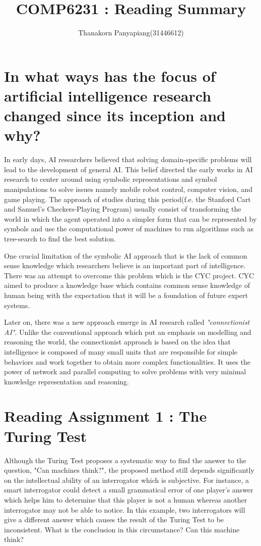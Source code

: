 \documentclass{article}
\title{COMP6231 : Reading Summary}
\author{Thanakorn Panyapiang(31446612)}
\date{}
\begin{document}
\maketitle
\section*{In what ways has the focus of artificial intelligence research changed since its inception and why?}

In early days, AI researchers believed that solving domain-specific problems will lead to the development of general AI. This belief directed the early works in AI research to center around using symbolic representations and symbol manipulations to solve issues namely mobile robot control, computer vision, and game playing. The approach of studies during this period(f.e. the Stanford Cart and Samuel's Checkers-Playing Program) usually consist of transforming the world in which the agent operated into a simpler form that can be represented by symbols and use the computational power of machines to run algorithms such as tree-search to find the best solution.

One crucial limitation of the symbolic AI approach that is the lack of common sense knowledge which researchers believe is an important part of intelligence. There was an attempt to overcome this problem which is the CYC project. CYC aimed to produce a knowledge base which contains common sense knowledge of human being with the expectation that it will be a foundation of future expert systems.

Later on, there was a new approach emerge in AI research called \textit{"connectionist AI"}. Unlike the conventional approach which put an emphasis on modelling and reasoning the world, the connectionist approach is based on the idea that intelligence is composed of many small units that are responsible for simple behaviors and work together to obtain more complex functionalities. It uses the power of network and parallel computing to solve problems with very minimal knowledge representation and reasoning.

\clearpage
\section*{Reading Assignment 1 : The Turing Test}
Although the Turing Test proposes a systematic way to find the answer to the question, "Can machines think?", the proposed method still depends significantly on the intellectual ability of an interrogator which is subjective. For instance, a smart interrogator could detect a small grammatical error of one player's answer which helps him to determine that this player is not a human whereas another interrogator may not be able to notice. In this example, two interrogators will give a different answer which causes the result of the Turing Test to be inconsistent. What is the conclusion in this circumstance? Can this machine think?
\end{document}
